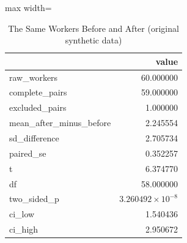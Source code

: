 \begin{table}[htbp]
\centering
\caption{The Same Workers Before and After (original synthetic data)}
\begingroup
\small
\setlength{\tabcolsep}{6pt}
\renewcommand{\arraystretch}{1.12}
\begin{adjustbox}{max width=\linewidth}
\begin{tabular}{@{}lr@{}}
\toprule
 & value \\
\midrule
raw\_workers & 60.000000 \\
complete\_pairs & 59.000000 \\
excluded\_pairs & 1.000000 \\
mean\_after\_minus\_before & 2.245554 \\
sd\_difference & 2.705734 \\
paired\_se & 0.352257 \\
t & 6.374770 \\
df & 58.000000 \\
two\_sided\_p & $3.260492 \times 10^{-8}$ \\
ci\_low & 1.540436 \\
ci\_high & 2.950672 \\
\bottomrule
\end{tabular}
\end{adjustbox}
\endgroup
\end{table}